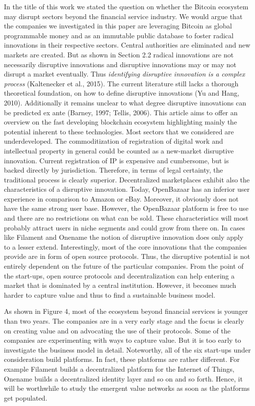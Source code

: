 In the title of this work we stated the question on whether the Bitcoin ecosystem 
may disrupt sectors beyond the financial service industry. We would argue that 
the companies we investigated in this paper are leveraging Bitcoin as global programmable 
money and as an immutable public database to foster radical innovations in their 
respective sectors. Central authorities are eliminated and new markets are created. 
But as shown in Section 2.2 radical innovations are not necessarily disruptive 
innovations and disruptive innovations may or may not disrupt a market eventually. 
Thus \emph{identifying disruptive innovation is a complex process} (Kaltenecker et 
al., 2015). The current literature still lacks a thorough theoretical foundation, 
on how to define disruptive innovations (Yu and Hang, 2010). Additionally it remains 
unclear to what degree disruptive innovations can be predicted ex ante (Barney, 
1997; Tellis, 2006). This article aims to offer an overview on the fast developing 
blockchain ecosystem highlighting mainly the potential inherent to these technologies. 
Most sectors that we considered are underdeveloped. The commoditization of registration 
of digital work and intellectual property in general could be counted as a new-market 
disruptive innovation. Current registration of IP is expensive and cumbersome, 
but is backed directly by jurisdiction. Therefore, in terms of legal certainty, 
the traditional process is clearly superior. Decentralized marketplaces exhibit 
also the characteristics of a disruptive innovation. Today, OpenBazaar has an inferior 
user experience in comparison to Amazon or eBay. Moreover, it obviously does not 
have the same strong user base. However, the OpenBazaar platform is free to use 
and there are no restrictions on what can be sold. These characteristics will most 
probably attract users in niche segments and could grow from there on. In cases 
like Filament and Onename the notion of disruptive innovation does only apply to 
a lesser extend. Interestingly, most of the core innovations that the companies 
provide are in form of open source protocols. Thus, the disruptive potential is 
not entirely dependent on the future of the particular companies. From the point 
of the start-ups, open source protocols and decentralization can help entering 
a market that is dominated by a central institution. However, it becomes much harder 
to capture value and thus to find a sustainable business model.

As shown in Figure 4, most of the ecosystem beyond financial services is younger 
than two years. The companies are in a very early stage and the focus is clearly 
on creating value and on advocating the use of their protocols. Some of the companies 
are experimenting with ways to capture value. But it is too early to investigate 
the business model in detail. Noteworthy, all of the six start-ups under consideration 
build platforms. In fact, these platforms are rather different. For example Filament 
builds a decentralized platform for the Internet of Things, Onename builds a decentralized 
identity layer and so on and so forth. Hence, it will be worthwhile to study the 
emergent value networks as soon as the platforms get populated.

